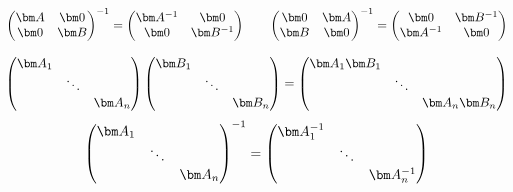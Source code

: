 \begin{equation}
    \begin{pmatrix}
        \mat{A} & \mat{0} \\
        \mat{0} & \mat{B}
    \end{pmatrix}^{-1}
    =
    \begin{pmatrix}
        \mat{A}^{-1} & \mat{0}      \\
        \mat{0}      & \mat{B}^{-1}
    \end{pmatrix}
    \qquad
    \begin{pmatrix}
        \mat{0} & \mat{A} \\
        \mat{B} & \mat{0}
    \end{pmatrix}^{-1}
    =
    \begin{pmatrix}
        \mat{0}      & \mat{B}^{-1} \\
        \mat{A}^{-1} & \mat{0}
    \end{pmatrix}
\end{equation}

\begin{equation}
    \begin{pmatrix}
        \mat{A}_1 &        &           \\
                  & \ddots &           \\
                  &        & \mat{A}_n
    \end{pmatrix}
    \begin{pmatrix}
        \mat{B}_1 &        &           \\
                  & \ddots &           \\
                  &        & \mat{B}_n
    \end{pmatrix}
    =
    \begin{pmatrix}
        \mat{A}_1\mat{B}_1 &        &                    \\
                           & \ddots &                    \\
                           &        & \mat{A}_n\mat{B}_n
    \end{pmatrix}
\end{equation}
\begin{equation}
    \begin{pmatrix}
        \mat{A}_1 &        &           \\
                  & \ddots &           \\
                  &        & \mat{A}_n
    \end{pmatrix}^{-1}
    =
    \begin{pmatrix}
        \mat{A}_1^{-1} &        &                \\
                       & \ddots &                \\
                       &        & \mat{A}_n^{-1}
    \end{pmatrix}
\end{equation}

